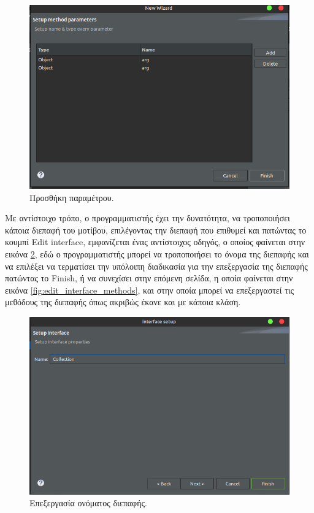 \begin{figure}[H]
    \centering
    \includegraphics[width=1.0\textwidth]{Figures/add_parameters.png}
    \caption{Προσθήκη παραμέτρου.}
    \label{fig:add_parameters}
\end{figure}
Με αντίστοιχο τρόπο, ο προγραμματιστής έχει την δυνατότητα, να τροποποιήσει κάποια διεπαφή του μοτίβου, 
επιλέγοντας την διεπαφή που επιθυμεί και πατώντας το κουμπί Edit interface, εμφανίζεται ένας αντίστοιχος οδηγός, ο οποίος φαίνεται 
στην εικόνα \ref{fig:edit_interface}, εδώ ο προγραμματιστής μπορεί να τροποποιήσει το όνομα της διεπαφής 
και να επιλέξει να τερματίσει την υπόλοιπη διαδικασία για την επεξεργασία της διεπαφής πατώντας το Finish, ή να συνεχίσει στην επόμενη 
σελίδα, η οποία φαίνεται στην εικόνα \ref{fig:edit_interface_methods}, και στην οποία μπορεί να 
επεξεργαστεί τις μεθόδους της διεπαφής όπως ακριβώς έκανε και με κάποια κλάση.
\begin{figure}[H]
    \centering
    \includegraphics[width=1.0\textwidth]{Figures/edit_interface.png}
    \caption{Επεξεργασία ονόματος διεπαφής.}
    \label{fig:edit_interface}
\end{figure}
